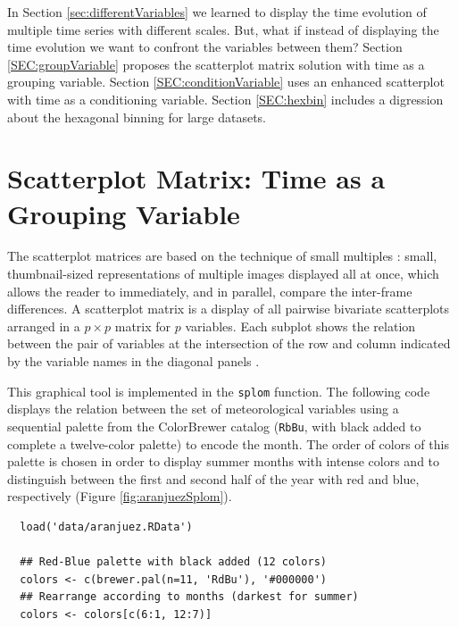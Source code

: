 \documentclass[smallroyalvopaper]{memoir}
\begin{document}
In Section \ref{sec:differentVariables} we learned to display the time evolution of multiple time series with different scales. But, what if instead of displaying the time evolution we want to confront the variables between them? Section \ref{SEC:groupVariable} proposes the scatterplot matrix solution with time as a grouping variable. Section \ref{SEC:conditionVariable} uses an enhanced scatterplot with time as a conditioning variable. Section \ref{SEC:hexbin} includes a digression about the hexagonal binning for large datasets.

\section{Scatterplot Matrix: Time as a Grouping Variable \label{SEC:groupVariable}}
\label{sec:org3632fd6}

The scatterplot matrices are based on the technique of small multiples
\cite{Tufte1990}: small, thumbnail-sized representations of multiple
images displayed all at once, which allows the reader to immediately,
and in parallel, compare the inter-frame differences.  A scatterplot
matrix is a display of all pairwise bivariate scatterplots arranged in
a \(p \times p\) matrix for \(p\) variables. Each subplot shows the
relation between the pair of variables at the intersection of the row
and column indicated by the variable names in the diagonal panels
\cite{Friendly.Denis2005}.

This graphical tool is implemented in the \texttt{splom} function. The
following code displays the relation between the set of
meteorological variables using a sequential palette from the
ColorBrewer catalog (\texttt{RbBu}, with black added to complete a
twelve-color palette) to encode the month. The order of colors of
this palette is chosen in order to display summer months with
intense colors and to distinguish between the first and second
half of the year with red and blue, respectively (Figure
\ref{fig:aranjuezSplom}).


\lstset{language=r,label= ,caption= ,captionpos=b,numbers=none}
\begin{lstlisting}
  load('data/aranjuez.RData')
  
  ## Red-Blue palette with black added (12 colors)
  colors <- c(brewer.pal(n=11, 'RdBu'), '#000000')
  ## Rearrange according to months (darkest for summer)
  colors <- colors[c(6:1, 12:7)]
\end{lstlisting}
\end{document}
